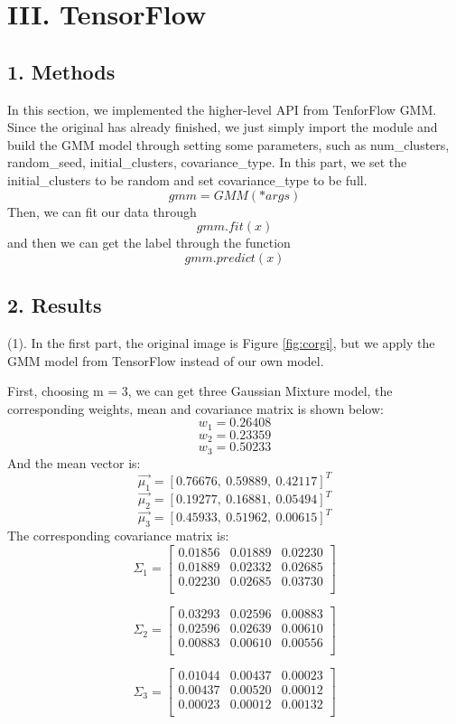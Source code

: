 \newpage
\section*{\Large III. TensorFlow}

\subsection*{\large 1. Methods}
In this section, we implemented the higher-level API from TenforFlow GMM. Since the original has already finished, we just simply import the module and build the GMM model through setting some parameters, such as num\_clusters, random\_seed, initial\_clusters, covariance\_type. In this part, we set the initial\_clusters to be random and set covariance\_type to be full. 
$$gmm = GMM(*args)$$
Then, we can fit our data through $$gmm.fit(x)$$
and then we can get the label through the function $$gmm.predict(x)$$

\subsection*{\large 2. Results}

(1). In the first part, the original image is Figure \ref{fig:corgi}, but we apply the GMM model from TensorFlow instead of our own model.

First, choosing m = 3, we can get three Gaussian Mixture model, the corresponding weights, mean and covariance matrix is shown below:
$$ w_1 = 0.26408 $$
$$ w_2 = 0.23359 $$
$$ w_3 = 0.50233 $$
And the mean vector is:
$$ \vec{\mu_1} = [0.76676, \  0.59889, \  0.42117]^T$$
$$ \vec{\mu_2} = [0.19277, \  0.16881, \  0.05494]^T$$
$$ \vec{\mu_3} = [0.45933, \   0.51962, \  0.00615]^T$$
The corresponding covariance matrix is:
$$\Sigma_1 =
\begin{bmatrix}
	0.01856 &	0.01889 &	0.02230 \\
  	0.01889 &	0.02332 &	0.02685 \\
  	0.02230 &	0.02685 &	0.03730 \\
\end{bmatrix}$$

$$\Sigma_2 =
\begin{bmatrix}
	0.03293 &	0.02596 &	0.00883	\\
  	0.02596 &	0.02639 &	0.00610	\\
  	0.00883 &	0.00610 &	0.00556 \\
\end{bmatrix}$$

$$\Sigma_3 =
\begin{bmatrix}
	0.01044 &	0.00437 &	0.00023 \\
  	0.00437 &	0.00520 &	0.00012 \\
  	0.00023 &	0.00012 &	0.00132 \\
\end{bmatrix}$$


